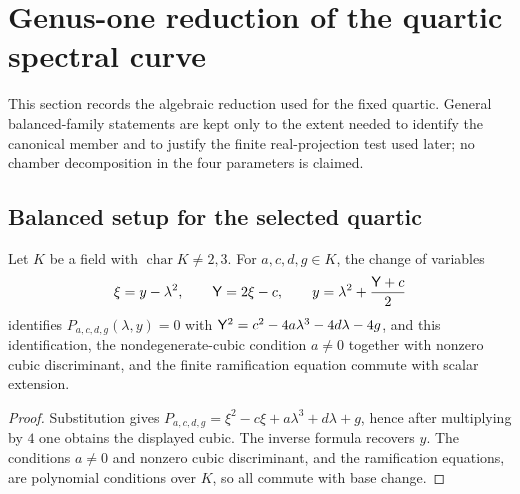 \section{Genus-one reduction of the quartic spectral curve}\label{sec:genus-one}

This section records the algebraic reduction used for the fixed quartic.  General balanced-family statements are kept only to the extent needed to identify the canonical member and to justify the finite real-projection test used later; no chamber decomposition in the four parameters is claimed.

\subsection{Balanced setup for the selected quartic}

\begin{lemma}\label{lem:balanced-base-field}
Let $K$ be a field with $\operatorname{char}K\ne2,3$.  For $a,c,d,g\in K$, the change of variables
\[
\xi=y-\lambda^2,\qquad \mathsf{Y}=2\xi-c,
\qquad y=\lambda^2+\frac{\mathsf{Y}+c}{2}
\]
identifies $P_{a,c,d,g}(\lambda,y)=0$ with $\mathsf{Y}^2=c^2-4a\lambda^3-4d\lambda-4g$, and this identification, the nondegenerate-cubic condition $a\ne0$ together with nonzero cubic discriminant, and the finite ramification equation commute with scalar extension.
\end{lemma}
\begin{proof}
Substitution gives
$P_{a,c,d,g}=\xi^2-c\xi+a\lambda^3+d\lambda+g$, hence after multiplying by $4$ one obtains the displayed cubic.  The inverse formula recovers $y$.  The conditions $a\ne0$ and nonzero cubic discriminant, and the ramification equations, are polynomial conditions over $K$, so all commute with base change.
\end{proof}

